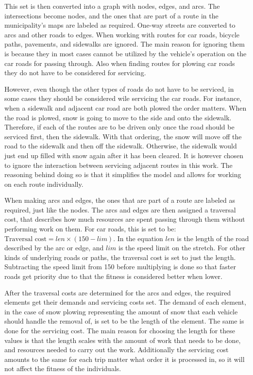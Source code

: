 This set is then converted into a graph with nodes, edges, and arcs. The intersections become nodes, and the ones that are part of a route in the municipality's maps are labeled as required. One-way streets are converted to arcs and other roads to edges. When working with routes for car roads, bicycle paths, pavements, and sidewalks are ignored. The main reason for ignoring them is because they in most cases cannot be utilized by the vehicle's operation on the car roads for passing through. Also when finding routes for plowing car roads they do not have to be considered for servicing.

However, even though the other types of roads do not have to be serviced, in some cases they should be considered wile servicing the car roads. For instance, when a sidewalk and adjacent car road are both plowed the order matters. When the road is plowed, snow is going to move to the side and onto the sidewalk. Therefore, if each of the routes are to be driven only once the road should be serviced first, then the sidewalk. With that ordering, the snow will move off the road to the sidewalk and then off the sidewalk. Otherwise, the sidewalk would just end up filled with snow again after it has been cleared. It is however chosen to ignore the interaction between servicing adjacent routes in this work. The reasoning behind doing so is that it simplifies the model and allows for working on each route individually.

When making arcs and edges, the ones that are part of a route are labeled as required, just like the nodes. The arcs and edges are then assigned a traversal cost, that describes how much resources are spent passing through them without performing work on them. For car roads, this is set to be: $\text{Traversal cost} = len \times (150 - lim)$. In the equation $len$ is the length of the road described by the arc or edge, and $lim$ is the speed limit on the stretch. For other kinds of underlying roads or paths, the traversal cost is set to just the length. Subtracting the speed limit from 150 before multiplying is done so that faster roads get priority due to that the fitness is considered better when lower.

After the traversal costs are determined for the arcs and edges, the required elements get their demands and servicing costs set. The demand of each element, in the case of snow plowing representing the amount of snow that each vehicle should handle the removal of, is set to be the length of the element. The same is done for the servicing cost. The main reason for choosing the length for these values is that the length scales with the amount of work that needs to be done, and resources needed to carry out the work. Additionally the servicing cost amounts to the same for each trip matter what order it is processed in, so it will not affect the fitness of the individuals.

